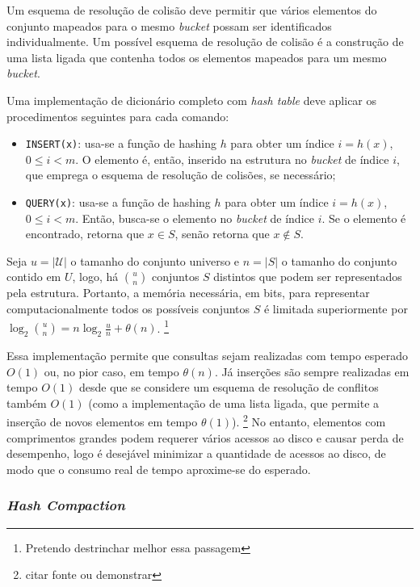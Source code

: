 \documentclass[12pt,twoside,english,brazilian]{article}
\begin{document}
Um esquema de resolução de colisão deve permitir que vários elementos do conjunto mapeados para o mesmo \textit{bucket} possam ser identificados individualmente. Um possível esquema de resolução de colisão é a construção de uma lista ligada que contenha todos os elementos mapeados para um mesmo \textit{bucket}.

Uma implementação de dicionário completo com \textit{hash table} deve aplicar os procedimentos seguintes para cada comando:
\begin{itemize}
    \item \texttt{INSERT(x)}: usa-se a função de hashing $h$ para obter um índice $i = h(x)$, $0 \leq i < m$. O elemento é, então, inserido na estrutura no \textit{bucket} de índice $i$, que emprega o esquema de resolução de colisões, se necessário;
    \item \texttt{QUERY(x)}: usa-se a função de hashing $h$ para obter um índice $i = h(x)$, $0 \leq i < m$. Então, busca-se o elemento no \textit{bucket} de índice $i$. Se o elemento é encontrado, retorna que $x \in S$, senão retorna que $x \notin S$.
\end{itemize}

Seja $u = |\mathcal{U}|$ o tamanho do conjunto universo e $n=|S|$ o tamanho do conjunto contido em $U$, logo, há $\binom{u}{n}$ conjuntos $S$ distintos que podem ser representados pela estrutura. Portanto, a memória necessária, em bits, para representar computacionalmente todos os possíveis conjuntos $S$ é limitada superiormente por $\log_2 \binom{u}{n} = n \log_2 \frac{u}{n} + \theta(n)$. \footnote{Pretendo destrinchar melhor essa passagem}

Essa implementação permite que consultas sejam realizadas com tempo esperado $O(1)$ ou, no pior caso, em tempo $\theta(n)$. Já inserções são sempre realizadas em tempo $O(1)$ desde que se considere um esquema de resolução de conflitos também $O(1)$ (como a implementação de uma lista ligada, que permite a inserção de novos elementos em tempo $\theta(1)$). \footnote{citar fonte ou demonstrar} No entanto, elementos com comprimentos grandes podem requerer vários acessos ao disco e causar perda de desempenho, logo é desejável minimizar a quantidade de acessos ao disco, de modo que o consumo real de tempo aproxime-se do esperado.

\subsubsection{\textit{Hash Compaction}}
\end{document}
